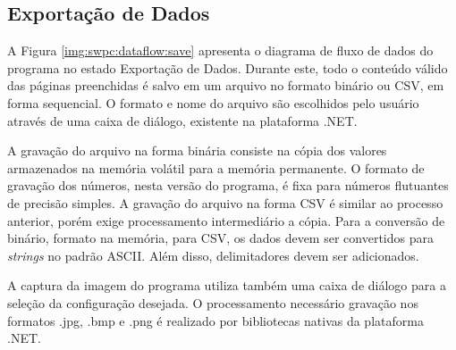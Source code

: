 		\subsection{Exportação de Dados}\label{sec:swpc:save}

			A Figura \ref{img:swpc:dataflow:save} apresenta o diagrama de fluxo de dados do programa no estado Exportação de Dados. Durante este, todo o conteúdo válido das páginas preenchidas é salvo em um arquivo no formato binário ou CSV, em forma sequencial. O formato e nome do arquivo são escolhidos pelo usuário através de uma caixa de diálogo, existente na plataforma .NET.

			A gravação do arquivo na forma binária consiste na cópia dos valores armazenados na memória volátil para a memória permanente. O formato de gravação dos números, nesta versão do programa, é fixa para números flutuantes de precisão simples. A gravação do arquivo na forma CSV é similar ao processo anterior, porém exige processamento intermediário a cópia. Para a conversão de binário, formato na memória, para CSV, os dados devem ser convertidos para \textit{strings} no padrão ASCII. Além disso, delimitadores devem ser adicionados.

			A captura da imagem do programa utiliza também uma caixa de diálogo para a seleção da configuração desejada. O processamento necessário gravação nos formatos .jpg, .bmp e .png é realizado por bibliotecas nativas da plataforma .NET.

